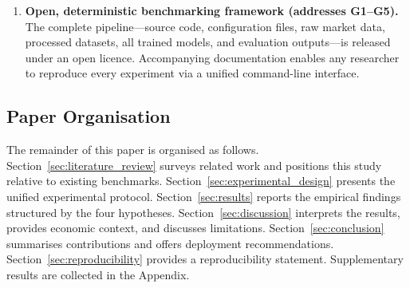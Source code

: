 \begin{enumerate}[label=\textbf{C\arabic*.}]
  \item \textbf{Open, deterministic benchmarking framework (addresses G1--G5).}  The complete pipeline---source code, configuration files, raw market data, processed datasets, all trained models, and evaluation outputs---is released under an open licence.  Accompanying documentation enables any researcher to reproduce every experiment via a unified command-line interface.
\end{enumerate}

\subsection{Paper Organisation}
\label{sec:outline}

The remainder of this paper is organised as follows.  Section~\ref{sec:literature_review} surveys related work and positions this study relative to existing benchmarks.  Section~\ref{sec:experimental_design} presents the unified experimental protocol.  Section~\ref{sec:results} reports the empirical findings structured by the four hypotheses.  Section~\ref{sec:discussion} interprets the results, provides economic context, and discusses limitations.  Section~\ref{sec:conclusion} summarises contributions and offers deployment recommendations.  Section~\ref{sec:reproducibility} provides a reproducibility statement.  Supplementary results are collected in the Appendix.
